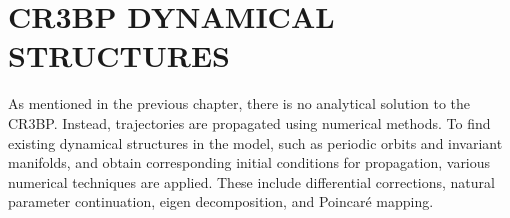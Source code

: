 \chapter{CR3BP DYNAMICAL STRUCTURES}

As mentioned in the previous chapter, there is no analytical solution to the CR3BP. Instead,
trajectories are propagated using numerical methods. To find existing dynamical structures in the
model, such as periodic orbits and invariant manifolds, and obtain corresponding initial conditions
for propagation, various numerical techniques are applied. These include differential corrections,
natural parameter continuation, eigen decomposition, and Poincar\'e mapping.





